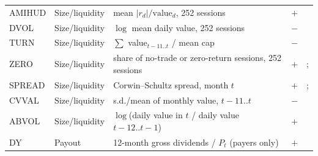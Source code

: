\begin{tabular}{llp{6.3cm}cl}
AMIHUD & Size/liquidity & mean $|r_d|/\text{value}_d$, 252 sessions & $+$ & \citet{amihud2002illiquidity} \\
DVOL & Size/liquidity & $\log$ mean daily value, 252 sessions & $-$ & \citet{brennan1998alternative} \\
TURN & Size/liquidity & $\sum$ value$_{t-11..t}$ / mean cap & $-$ & \citet{datar1998liquidity} \\
ZERO & Size/liquidity & share of no-trade or zero-return sessions, 252 sessions & $+$ & \citet{lesmond1999new}; \citet{bekaert2007liquidity} \\
SPREAD & Size/liquidity & Corwin--Schultz spread, month $t$ & $+$ & \citet{corwin2012simple}; \citet{amihud1986asset} \\
CVVAL & Size/liquidity & s.d./mean of monthly value, $t{-}11..t$ & $-$ & \citet{chordia2001trading} \\
ABVOL & Size/liquidity & $\log$(daily value in $t$ / daily value $t{-}12..t{-}1$) & $+$ & \citet{gervais2001high} \\
\addlinespace[2pt]
DY & Payout & 12-month gross dividends / $P_t$ (payers only) & $+$ & \citet{litzenberger1979effect} \\
\bottomrule
\end{tabular}